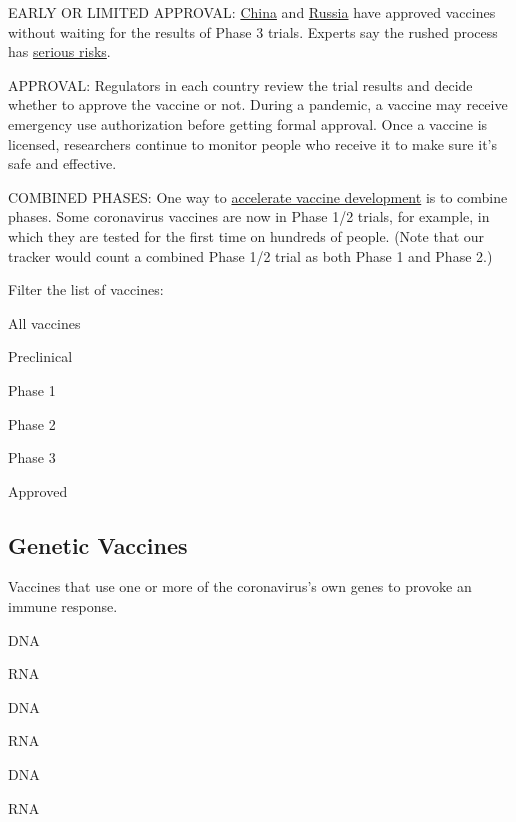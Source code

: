 EARLY OR LIMITED APPROVAL: \protect\hyperlink{cansino}{China} and
\protect\hyperlink{gamaleya}{Russia} have approved vaccines without
waiting for the results of Phase 3 trials. Experts say the rushed
process has
\href{https://www.nytimes3xbfgragh.onion/2020/08/11/health/russia-covid-19-vaccine-safety.html}{serious
risks}.

APPROVAL: Regulators in each country review the trial results and decide
whether to approve the vaccine or not. During a pandemic, a vaccine may
receive emergency use authorization before getting formal approval. Once
a vaccine is licensed, researchers continue to monitor people who
receive it to make sure it's safe and effective.

COMBINED PHASES: One way to
\href{https://www.nytimes3xbfgragh.onion/interactive/2020/04/30/opinion/coronavirus-covid-vaccine.html}{accelerate
vaccine development} is to combine phases. Some coronavirus vaccines are
now in Phase 1/2 trials, for example, in which they are tested for the
first time on hundreds of people. (Note that our tracker would count a
combined Phase 1/2 trial as both Phase 1 and Phase 2.)

Filter the list of vaccines:

All vaccines

Preclinical

Phase 1

Phase 2

Phase 3

Approved

\hypertarget{genetic-vaccines}{%
\subsection{Genetic Vaccines}\label{genetic-vaccines}}

Vaccines that use one or more of the coronavirus's own genes to provoke
an immune response.

DNA

RNA

DNA

RNA

DNA

RNA

